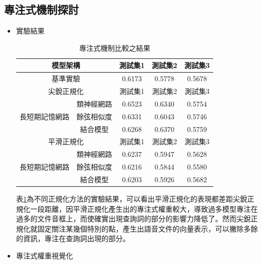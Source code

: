 \subsection{專注式機制探討}
\begin{itemize}
\item{實驗結果}

\begin{table}[ht]
	 \centering
	 \caption{專注式機制比較之結果}
	 \label{table:ch4_att}
	 \begin{tabular}{|c|c|c|c|c|}
		 \hline
		 \multicolumn{2}{|c|}{模型架構} & 測試集1 & 測試集2 & 測試集3 \\
		 \hline
		 \multicolumn{2}{|c|}{基準實驗} & 0.6173 & 0.5778 & 0.5678\\
		 \hline
		 \hline 
		 \multicolumn{2}{|c|}{尖銳正規化} & 測試集1 &測試集2 & 測試集3 \\
		 \hline
		 \multirow{3}{*}{長短期記憶網路} & 類神經網路 &
		 {\color{red}0.6523} &0.6340 & 0.5754 \\
		 \cline{2-5}
		 & 餘弦相似度& 0.6331 & 0.6043 & 0.5746 \\
		 \cline{2-5}
		 & 結合模型 & 0.6268 & 0.6370 & 0.5759 \\ 
		 \hline
		 \hline
		 \multicolumn{2}{|c|}{平滑正規化} & 測試集1 &測試集2
		 &測試集3 \\
		 \hline
		 \multirow{3}{*}{長短期記憶網路} & 類神經網路 &
		 0.6237 & 0.5947 & 0.5628\\
		 \cline{2-5}
		 & 餘弦相似度& 0.6216 &0.5844 & 0.5580 \\
		 \cline{2-5}
		 & 結合模型 &0.6203&0.5926&0.5682 \\
		 \hline
	   \end{tabular}
\end{table}
表\ref{table:ch4_att}為不同正規化方法的實驗結果，可以看出平滑正規化的表現都差距尖銳正規化一段距離，因平滑正規化產生出的專注式權重較大，導致過多模型專注在過多的文件音框上，而使確實出現查詢詞的部分的影響力降低了。然而尖銳正規化就固定關注某幾個特別的點，產生出語音文件的向量表示，可以撇除多餘的資訊，專注在查詢詞出現的部分。
\item{專注式權重視覺化}


\end{itemize}
